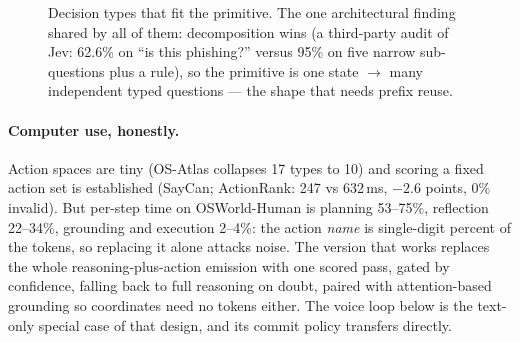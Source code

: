 \documentclass[11pt,a4paper]{article}
\begin{document}
\begin{figure}[H]
\centering
{}
\caption{Decision types that fit the primitive. The one architectural finding shared by all of them: decomposition wins (a third-party audit of Jev: 62.6\% on ``is this phishing?'' versus 95\% on five narrow sub-questions plus a rule), so the primitive is one state $\to$ many independent typed questions --- the shape that needs prefix reuse.}
\end{figure}

\paragraph{Computer use, honestly.} Action spaces are tiny (OS-Atlas collapses 17 types to 10) and scoring a fixed action set is established (SayCan; ActionRank: 247 vs 632\,ms, $-2.6$ points, 0\% invalid). But per-step time on OSWorld-Human is planning 53--75\%, reflection 22--34\%, grounding and execution 2--4\%: the action \emph{name} is single-digit percent of the tokens, so replacing it alone attacks noise. The version that works replaces the whole reasoning-plus-action emission with one scored pass, gated by confidence, falling back to full reasoning on doubt, paired with attention-based grounding so coordinates need no tokens either. The voice loop below is the text-only special case of that design, and its commit policy transfers directly.
\end{document}
